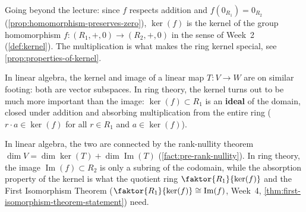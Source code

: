 \begin{content}


\begin{steps}
Going beyond the lecture: since $f$ respects addition and $f(0_{R_1}) = 0_{R_2}$ (\cref{prop:homomorphism-preserves-zero}), $\ker(f)$ is the kernel of the group homomorphism $f \colon (R_1, +, 0) \to (R_2, +, 0)$ in the sense of Week~2 (\cref{def:kernel}). The multiplication is what makes the ring kernel special, see \cref{prop:properties-of-kernel}.
\end{steps}
\end{content}

\begin{insight}
In linear algebra, the kernel and image of a linear map $T \colon V \to W$ are on similar footing: both are vector subspaces. In ring theory, the kernel turns out to be much more important than the image: $\ker(f) \subset R_1$ is an \textbf{ideal} of the domain, closed under addition and absorbing multiplication from the entire ring ($r \cdot a \in \ker(f)$ for all $r \in R_1$ and $a \in \ker(f)$).
\end{insight}

\begin{aiNote}
In linear algebra, the two are connected by the rank-nullity theorem $\dim V = \dim \ker(T) + \dim \operatorname{Im}(T)$ (\cref{fact:pre-rank-nullity}). In ring theory, the image $\operatorname{Im}(f) \subset R_2$ is only a subring of the codomain, while the absorption property of the kernel is what the quotient ring $\faktor{R_1}{\ker(f)}$ and the First Isomorphism Theorem ($\faktor{R_1}{\ker(f)} \cong \operatorname{Im}(f)$, Week~4, \cref{thm:first-isomorphism-theorem-statement}) need.
\end{aiNote}

